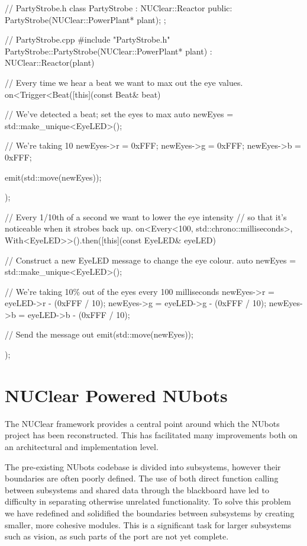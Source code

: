 \documentclass[english,12pt]{scrartcl}
\begin{document}
			\begin{cppcode}
				// PartyStrobe.h
				class PartyStrobe : NUClear::Reactor {
				    public:
				        PartyStrobe(NUClear::PowerPlant* plant);
				};

				// PartyStrobe.cpp
				#include "PartyStrobe.h"
				PartyStrobe::PartyStrobe(NUClear::PowerPlant* plant)
				: NUClear::Reactor(plant) {
				    // Every time we hear a beat we want to max out the eye values.
				    on<Trigger<Beat([this](const Beat& beat) {
				        // We've detected a beat; set the eyes to max
				        auto newEyes = std::make_unique<EyeLED>();

				        // We're taking 10%
				        newEyes->r = 0xFFF;
				        newEyes->g = 0xFFF;
				        newEyes->b = 0xFFF;

				        emit(std::move(newEyes));
				    });

				    // Every 1/10th of a second we want to lower the eye intensity
				    // so that it's noticeable when it strobes back up.
				    on<Every<100, std::chrono::milliseconds>,
				       With<EyeLED>>().then([this](const EyeLED& eyeLED) {
				        // Construct a new EyeLED message to change the eye colour.
				        auto newEyes = std::make_unique<EyeLED>();

				        // We're taking 10\% out of the eyes every 100 milliseconds
				        newEyes->r = eyeLED->r - (0xFFF / 10);
				        newEyes->g = eyeLED->g - (0xFFF / 10);
				        newEyes->b = eyeLED->b - (0xFFF / 10);

				         // Send the message out
				         emit(std::move(newEyes));
				    });
				}
			\end{cppcode}

	\section{NUClear Powered NUbots}
		The NUClear framework provides a central point around which the NUbots project has been
		reconstructed. This has facilitated many improvements both on an architectural and
		implementation level.

		The pre-existing NUbots codebase is divided into subsystems, however their boundaries are
		often poorly defined. The use of both direct function calling between subsystems and
		shared data through the blackboard have led to difficulty in separating otherwise
		unrelated functionality. To solve this problem we have redefined and solidified the
		boundaries between subsystems by creating smaller, more cohesive modules. This is a
		significant task for larger subsystems such as vision, as such parts of the port are
		not yet complete.
\end{document}
